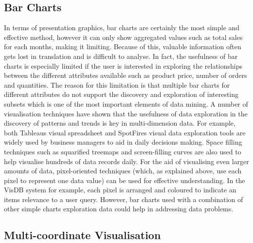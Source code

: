 \subsection{Bar Charts}

In terms of presentation graphics, bar charts are certainly the most simple and effective method, however it can only show aggregated values such as total sales for each months, making it limiting. Because of this, valuable information often gets lost in translation and is difficult to analyse. In fact, the usefulness of bar charts is especially limited if the user is interested in exploring the relationships between the different attributes available such as product price, number of orders and quantities.  The reason for this limitation is that multiple bar charts for different attributes do not support the discovery and exploration of interesting subsets which is one of the most important elements of data mining. A number of visualisation techniques have shown that the usefulness of data exploration in the discovery of patterns and trends is key in multi-dimension data. For example, both Tableaus visual spreadsheet \cite{tableau} and SpotFires visual data exploration tools \cite{spotfire} are widely used by business managers to aid in daily decisions making. Space filling techniques such as squarified treemaps and screen-filling curves are also used to help visualise hundreds of data records daily. For the aid of visualising even larger amounts of data, pixel-oriented techniques (which, as explained above, use each pixel to represent one data value) can be used for effective understanding. In the VisDB system \cite{keim1994visdb} for example, each pixel is arranged and coloured to indicate an items relevance to a user query. However, bar charts used with a combination of other simple charts exploration data could help in addressing data problems.

\subsection{Multi-coordinate Visualisation}

